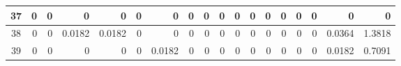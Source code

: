 \begin{table}[ht]
\begin{adjustbox}{width = \textwidth, center}
\begin{tabular}{|c|r|r|r|r|r|r|r|r|r|r|r|r|r|r|r|r|r|}
            \rowcolor[HTML]{FFFFFF} 
            \cellcolor[HTML]{CFE2F3}37                           & 0                                              & 0                                              & 0                                              & 0                                              & 0                                              & 0                                              & 0                                              & 0                                               & 0                                               & 0                                               & 0                                               & 0                                               & 0                                               & 0                                               & 0                                               & \cellcolor[HTML]{D9D2E9}0                                                             & \cellcolor[HTML]{D9D2E9}0                                                                 \\ \hline
            \rowcolor[HTML]{FFFFFF} 
            \cellcolor[HTML]{CFE2F3}38                           & 0                                              & 0                                              & \cellcolor[HTML]{C7E9D8}0.0182                 & \cellcolor[HTML]{C7E9D8}0.0182                 & 0                                              & 0                                              & 0                                              & 0                                               & 0                                               & 0                                               & 0                                               & 0                                               & 0                                               & 0                                               & 0                                               & \cellcolor[HTML]{D9D2E9}0.0364                                                        & \cellcolor[HTML]{D9D2E9}1.3818                                                            \\ \hline
            \rowcolor[HTML]{FFFFFF} 
            \cellcolor[HTML]{CFE2F3}39                           & 0                                              & 0                                              & 0                                              & 0                                              & 0                                              & \cellcolor[HTML]{C7E9D8}0.0182                 & 0                                              & 0                                               & 0                                               & 0                                               & 0                                               & 0                                               & 0                                               & 0                                               & 0                                               & \cellcolor[HTML]{D9D2E9}0.0182                                                        & \cellcolor[HTML]{D9D2E9}0.7091                                                            \\ \hline

\end{tabular}
\end{adjustbox}
\end{table}
